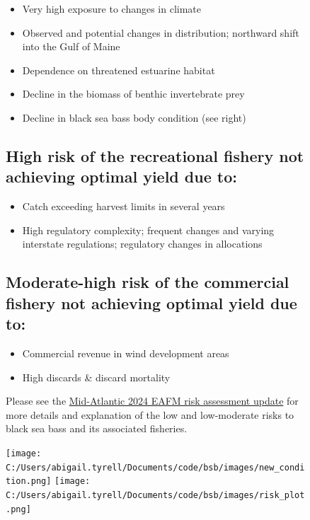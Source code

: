 \documentclass[
  10pt,
  letterpaper,
  DIV=11,
  numbers=noendperiod]{scrartcl}
\providecommand{\tightlist}{%
  \setlength{\itemsep}{0pt}\setlength{\parskip}{0pt}}\usepackage{longtable,booktabs,array}
\begin{document}
\begin{figure}
\begin{minipage}{0.57\linewidth}
\begin{itemize}
\tightlist
\item
  Very high exposure to changes in climate
\item
  Observed and potential changes in distribution; northward shift into
  the Gulf of Maine
\item
  Dependence on threatened estuarine habitat
\item
  Decline in the biomass of benthic invertebrate prey
\item
  Decline in black sea bass body condition (see right)
\end{itemize}

\vspace{-0.25cm}
\subsection{High risk of the recreational fishery not achieving optimal yield due to:}

\begin{itemize}
\tightlist
\item
  Catch exceeding harvest limits in several years
\item
  High regulatory complexity; frequent changes and varying interstate
  regulations; regulatory changes in allocations
\end{itemize}

\vspace{-0.25cm}
\subsection{Moderate-high risk of the commercial fishery not achieving optimal yield due to:}

\begin{itemize}
\tightlist
\item
  Commercial revenue in wind development areas
\item
  High discards \& discard mortality
\end{itemize}

\vspace{-0.25cm}

Please see the
\href{https://static1.squarespace.com/static/511cdc7fe4b00307a2628ac6/t/6747560a3cf66936045e5547/1732728332670/05_EAFM+Risk+Assessment.pdf}{Mid-Atlantic
2024 EAFM risk assessment update} for more details and explanation of
the low and low-moderate risks to black sea bass and its associated
fisheries.\end{minipage}%
%
\begin{minipage}{0.03\linewidth}

\hfill

\end{minipage}%
%
\begin{minipage}{0.40\linewidth}
\texttt{[image: C:/Users/abigail.tyrell/Documents/code/bsb/images/new\_condition.png]}
\texttt{[image: C:/Users/abigail.tyrell/Documents/code/bsb/images/risk\_plot.png]}\end{minipage}%

\end{figure}%
\end{document}
